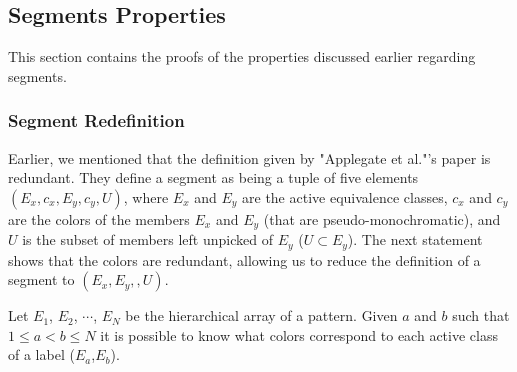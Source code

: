 \subsection{Segments Properties}
\label{ss_seg}

This section contains the proofs of the properties discussed earlier regarding segments.

\subsubsection{Segment Redefinition}

Earlier, we mentioned that the definition given by "Applegate et al."'s paper
\cite{ACJKLW07} is redundant. They define a segment as being a tuple of five elements $(E_{x},c_{x},E_{y},c_{y},U)$, where $E_{x}$ and $E_{y}$ are the active equivalence classes, $c_{x}$ and $c_{y}$ are the colors of the members $E_{x}$ and $E_{y}$ (that are pseudo-monochromatic), and $U$ is the subset of members left unpicked of $E_{y}$ ($U \subset E_{y}$). The next statement shows that the colors are redundant, allowing us to reduce the definition of a segment to $(E_{x},E_{y},,U)$.

\begin{proposition}
\label{corollary_known_colors}
Let $E_{1}$, $E_{2}$, $\cdots$, $E_{N}$ be the hierarchical array of a pattern. Given $a$ and $b$ such that $1 \leq a < b \leq N$ it is possible to know what colors correspond to each active class of a label ($E_{a}$,$E_{b}$).
\end{proposition}


